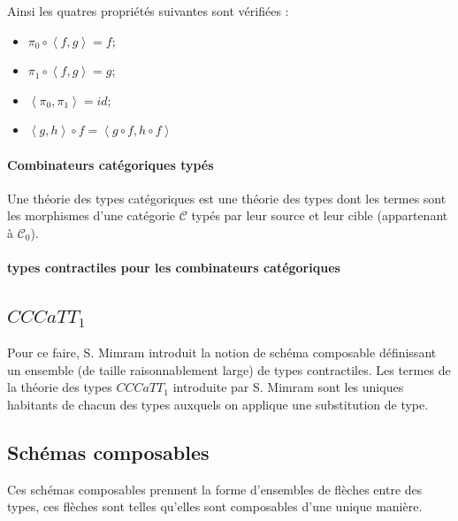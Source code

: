 \documentclass[12pt']{article}
\begin{document}
\begin{center}
\end{center}

Ainsi les quatres propriétés suivantes sont vérifiées :
\begin{itemize}
	\item $\pi_0 \circ \left<f, g\right> = f$;
	\item $\pi_1 \circ \left<f, g\right> = g$;
	\item $\left<\pi_0, \pi_1\right> = id$;
	\item $\left<g , h\right> \circ f = \left<g \circ f, h \circ f\right>$
\end{itemize}
	
\paragraph{Combinateurs catégoriques typés} Une théorie des types catégoriques est une théorie des types dont les termes sont les morphismes d'une catégorie $\mathcal{C}$ typés par leur source et leur cible (appartenant à $\mathcal{C}_0$).

\paragraph{types contractiles pour les combinateurs catégoriques}

\subsection{$CCCaTT_1$} Pour ce faire, S. Mimram introduit la notion de schéma composable définissant un ensemble (de taille raisonnablement large) de types contractiles. Les termes de la théorie des types $CCCaTT_1$ introduite par S. Mimram sont les uniques habitants de chacun des types auxquels on applique une substitution de type.

\subsection{Schémas composables} Ces schémas composables prennent la forme d'ensembles de flèches entre des types, ces flèches sont telles qu'elles sont composables d'une unique manière. 
  
\end{document}
